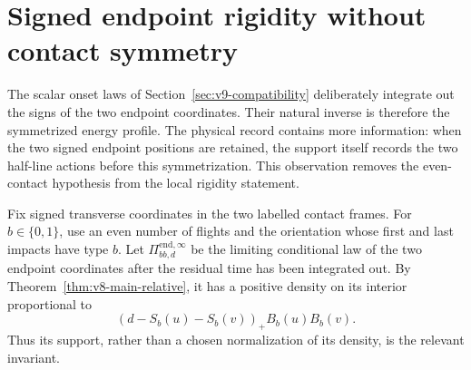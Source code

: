 \section{Signed endpoint rigidity without contact symmetry}
\label{sec:v19-signed-rigidity}

The scalar onset laws of Section~\ref{sec:v9-compatibility} deliberately
integrate out the signs of the two endpoint coordinates.  Their natural
inverse is therefore the symmetrized energy profile.  The physical record
contains more information: when the two signed endpoint positions are
retained, the support itself records the two half-line actions before this
symmetrization.  This observation removes the even-contact hypothesis from
the local rigidity statement.

Fix signed transverse coordinates in the two labelled contact frames.  For
$b\in\{0,1\}$, use an even number of flights and the orientation whose first
and last impacts have type $b$.  Let $\Pi^{\mathrm{end},\infty}_{bb,d}$ be
the limiting conditional law of the two endpoint coordinates after the
residual time has been integrated out.  By
Theorem~\ref{thm:v8-main-relative}, it has a positive density on its
interior proportional to
\begin{equation}\label{eq:v19-signed-endpoint-density}
 (d-S_b(u)-S_b(v))_+B_b(u)B_b(v).
\end{equation}
Thus its support, rather than a chosen normalization of its density, is the
relevant invariant.

